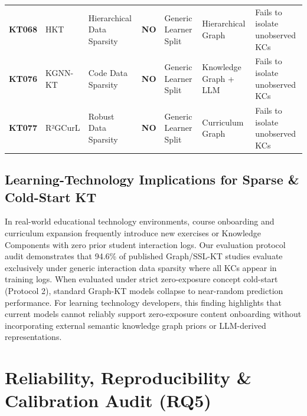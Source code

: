 \documentclass[journal]{IEEEtran}
\begin{document}
\begin{table}[t]
{\begin{tabular}{lllllll}
\textbf{KT068} & HKT \cite{KT068_HKT_2025} & Hierarchical Data Sparsity & \textbf{NO} & Generic Learner Split & Hierarchical Graph & Fails to isolate unobserved KCs \\
\textbf{KT076} & KGNN-KT \cite{KT076_KGNNKT_2025} & Code Data Sparsity & \textbf{NO} & Generic Learner Split & Knowledge Graph + LLM & Fails to isolate unobserved KCs \\
\textbf{KT077} & R²GCurL \cite{KT077_R2GCurL_2026} & Robust Data Sparsity & \textbf{NO} & Generic Learner Split & Curriculum Graph & Fails to isolate unobserved KCs \\
\bottomrule
\end{tabular}
}
\end{table}

\subsection{Learning-Technology Implications for Sparse \& Cold-Start KT}
In real-world educational technology environments, course onboarding and curriculum expansion frequently introduce new exercises or Knowledge Components with zero prior student interaction logs. Our evaluation protocol audit demonstrates that 94.6\% of published Graph/SSL-KT studies evaluate exclusively under generic interaction data sparsity where all KCs appear in training logs. When evaluated under strict zero-exposure concept cold-start (Protocol 2), standard Graph-KT models collapse to near-random prediction performance. For learning technology developers, this finding highlights that current models cannot reliably support zero-exposure content onboarding without incorporating external semantic knowledge graph priors or LLM-derived representations.

\section{Reliability, Reproducibility \& Calibration Audit (RQ5)}
\label{sec:reliability}
\end{document}
